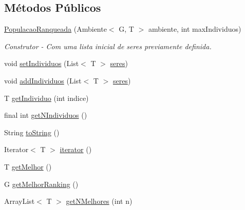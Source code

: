 \subsection*{Métodos Públicos}
\begin{DoxyCompactItemize}
\item 
\hyperlink{classic_1_1populacional_1_1_populacao_ranqueada_3_01_g_01extends_01_number_00_01_t_01extends_01_ser_3_01_g_01_4_01_4_a0d7b1366cf56626f589fb38bfa5f7fae}{Populacao\-Ranqueada} (Ambiente$<$ G, T $>$ ambiente, int max\-Individuos)
\begin{DoxyCompactList}\small\item\em Construtor -\/ Com uma lista inicial de {\ttfamily seres} previamente definida. \end{DoxyCompactList}\item 
void \hyperlink{classic_1_1populacional_1_1_populacao_ranqueada_3_01_g_01extends_01_number_00_01_t_01extends_01_ser_3_01_g_01_4_01_4_abbbf9db0fe711d0fd0db35fa5b5a4af9}{set\-Individuos} (List$<$ T $>$ \hyperlink{classic_1_1populacional_1_1_populacao_ranqueada_3_01_g_01extends_01_number_00_01_t_01extends_01_ser_3_01_g_01_4_01_4_a02259bafc5f948c7a67e75b7be04f225}{seres})
\item 
void \hyperlink{classic_1_1populacional_1_1_populacao_ranqueada_3_01_g_01extends_01_number_00_01_t_01extends_01_ser_3_01_g_01_4_01_4_af251798506b5745f81e1a533c3291c46}{add\-Individuos} (List$<$ T $>$ \hyperlink{classic_1_1populacional_1_1_populacao_ranqueada_3_01_g_01extends_01_number_00_01_t_01extends_01_ser_3_01_g_01_4_01_4_a02259bafc5f948c7a67e75b7be04f225}{seres})
\item 
T \hyperlink{classic_1_1populacional_1_1_populacao_ranqueada_3_01_g_01extends_01_number_00_01_t_01extends_01_ser_3_01_g_01_4_01_4_a724442d9bf54855f59664ad8e7c7ad57}{get\-Individuo} (int indice)
\item 
final int \hyperlink{classic_1_1populacional_1_1_populacao_ranqueada_3_01_g_01extends_01_number_00_01_t_01extends_01_ser_3_01_g_01_4_01_4_ac8c4bb834bee69a20ad15c5f40d424a9}{get\-N\-Individuos} ()
\item 
String \hyperlink{classic_1_1populacional_1_1_populacao_ranqueada_3_01_g_01extends_01_number_00_01_t_01extends_01_ser_3_01_g_01_4_01_4_a78793e9c88097491654860757e03b9ec}{to\-String} ()
\item 
Iterator$<$ T $>$ \hyperlink{classic_1_1populacional_1_1_populacao_ranqueada_3_01_g_01extends_01_number_00_01_t_01extends_01_ser_3_01_g_01_4_01_4_a450b0cbd81ca220619a7cdb0ba44d4d3}{iterator} ()
\item 
T \hyperlink{classic_1_1populacional_1_1_populacao_ranqueada_3_01_g_01extends_01_number_00_01_t_01extends_01_ser_3_01_g_01_4_01_4_a1438dac3978c7f5b8ffa923a94201a5a}{get\-Melhor} ()
\item 
G \hyperlink{classic_1_1populacional_1_1_populacao_ranqueada_3_01_g_01extends_01_number_00_01_t_01extends_01_ser_3_01_g_01_4_01_4_a55ae47e47cf0f59e8829fc6bb8cd8c6c}{get\-Melhor\-Ranking} ()
\item 
Array\-List$<$ T $>$ \hyperlink{classic_1_1populacional_1_1_populacao_ranqueada_3_01_g_01extends_01_number_00_01_t_01extends_01_ser_3_01_g_01_4_01_4_a1076c5a64e5bef012689f3543acd0cae}{get\-N\-Melhores} (int n)
\end{DoxyCompactItemize}
